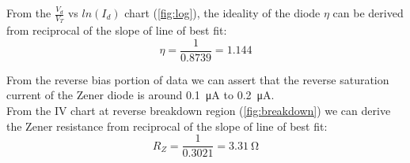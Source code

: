 \documentclass{article}
\begin{document}
From the $\frac{V_d}{V_T}$ vs $ln(I_d)$ chart (\ref{fig:log}), the ideality of the diode $\eta$ can be derived from reciprocal of the slope of line of best fit: $$\eta=\frac{1}{0.8739}=1.144$$

From the reverse bias portion of data we can assert that the reverse saturation current of the Zener diode is around \SI{0.1}{\micro\ampere} to \SI{0.2}{\micro\ampere}.\\


From the IV chart at reverse breakdown region (\ref{fig:breakdown}) we can derive the Zener resistance from reciprocal of the slope of line of best fit: $$R_Z=\frac{1}{0.3021}=\SI{3.31}{\ohm}$$



\newpage
\end{document}

